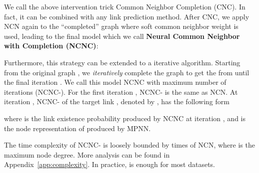 \documentclass{article}
\theoremstyle{plain}
\theoremstyle{definition}
\theoremstyle{remark}
\begin{document}
We call the above intervention trick Common Neighbor Completion (CNC). In fact, it can be combined with any link prediction method. After CNC, we apply NCN again to the ``completed'' graph where soft common neighbor weight  is used, leading to the final model which we call\textbf{ Neural Common Neighbor with Completion (NCNC)}:

Furthermore, this strategy can be extended to a iterative algorithm. Starting from the original graph , we \textit{iteratively} complete the graph to get the  from  until the final iteration . We call this model NCNC with maximum number of iterations  (NCNC-). For the first iteration , NCNC- is the same as NCN. At iteration , NCNC- of the target link , denoted by , has the following form

where  is the link existence probability produced by NCNC at iteration , and  is the node representation of  produced by MPNN. 

The time complexity of NCNC- is loosely bounded by  times of NCN, where  is the maximum node degree. More analysis can be found in Appendix~\ref{app:complexity}. In practice,  is enough for most datasets.


\iffalse

where the completion probability  is 

where the link existence probability is produced by an NCNC model with  maximum number of iterations.
\fi
\end{document}
